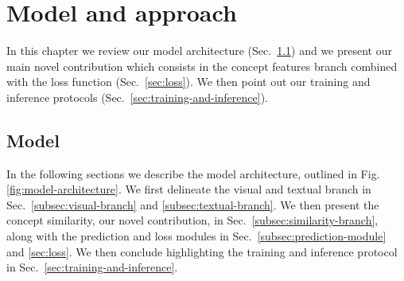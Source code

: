 
\chapter{Model and approach}
\label{ch:model}

In this chapter we review our model architecture
(Sec.~\ref{sec:model}) and we present our main novel contribution
which consists in the concept features branch combined with the loss
function (Sec.~\ref{sec:loss}). We then point out our training and
inference protocols (Sec.~\ref{sec:training-and-inference}).

\section{Model}
\label{sec:model}

In the following sections we describe the model architecture, outlined
in Fig.\ref{fig:model-architecture}. We first delineate the visual and
textual branch in Sec.~\ref{subsec:visual-branch} and
\ref{subsec:textual-branch}. We then present the concept similarity,
our novel contribution, in Sec.~\ref{subsec:similarity-branch}, along
with the prediction and loss modules in
Sec.~\ref{subsec:prediction-module} and \ref{sec:loss}. We then
conclude highlighting the training and inference protocol in
Sec.~\ref{sec:training-and-inference}.

